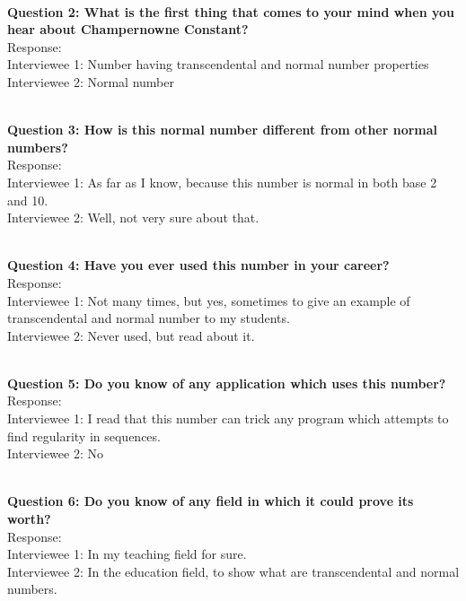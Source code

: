 \documentclass[paper=a4, fontsize=11pt]{scrartcl}
\numberwithin{equation}{section}		%
\numberwithin{figure}{section}			%
\numberwithin{table}{section}				%
\begin{document}
\begin{flushleft}
\setlength{\parskip}{\baselineskip}
\hrulefill
\\\textbf{Question 2: What is the first thing that comes to your mind when you hear about Champernowne Constant?}
\\Response:
\\Interviewee 1: Number having transcendental and normal number properties
\\Interviewee 2: Normal number
\end{flushleft}

\begin{flushleft}
\setlength{\parskip}{\baselineskip}
\hrulefill
\\\textbf{Question 3: How is this normal number different from other normal numbers?}
\\Response:
\\Interviewee 1: As far as I know, because this number is normal in both base 2 and 10.
\\Interviewee 2: Well, not very sure about that.
\end{flushleft}

\begin{flushleft}
\setlength{\parskip}{\baselineskip}
\hrulefill
\\\textbf{Question 4: Have you ever used this number in your career?}
\\Response:
\\Interviewee 1: Not many times, but yes, sometimes to give an example of transcendental and normal number to my students.
\\Interviewee 2: Never used, but read about it.
\end{flushleft}

\begin{flushleft}
\setlength{\parskip}{\baselineskip}
\hrulefill
\\\textbf{Question 5: Do you know of any application which uses this number? }
\\Response:
\\Interviewee 1: I read that this number can trick any program which attempts to find regularity in sequences.
\\Interviewee 2: No
\end{flushleft}

\begin{flushleft}
\setlength{\parskip}{\baselineskip}
\hrulefill
\\\textbf{Question 6: Do you know of any field in which it could prove its worth?}
\\Response:
\\Interviewee 1: In my teaching field for sure.
\\Interviewee 2: In the education field, to show what are transcendental and normal numbers.
\end{flushleft}
\end{document}

